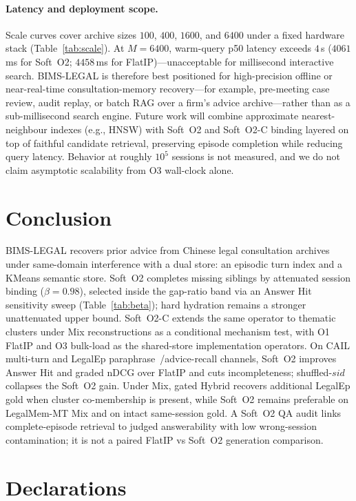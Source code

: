 \documentclass[preprint,12pt,authoryear]{elsarticle}
\begin{document}
\paragraph{Latency and deployment scope.}
Scale curves cover archive sizes $100$, $400$, $1600$, and $6400$ under a fixed hardware stack (Table~\ref{tab:scale}).
At $M{=}6400$, warm-query p50 latency exceeds $4$\,s ($4061$\,ms for Soft~O2; $4458$\,ms for FlatIP)---unacceptable for millisecond interactive search.
BIMS-LEGAL is therefore best positioned for high-precision offline or near-real-time consultation-memory recovery---for example, pre-meeting case review, audit replay, or batch RAG over a firm's advice archive---rather than as a sub-millisecond search engine.
Future work will combine approximate nearest-neighbour indexes (e.g., HNSW) with Soft~O2 and Soft~O2-C binding layered on top of faithful candidate retrieval, preserving episode completion while reducing query latency.
Behavior at roughly $10^5$ sessions is not measured, and we do not claim asymptotic scalability from O3 wall-clock alone.

\section{Conclusion}\label{sec:conclusion}

BIMS-LEGAL recovers prior advice from Chinese legal consultation archives under same-domain interference with a dual store: an episodic turn index and a KMeans semantic store.
Soft~O2 completes missing siblings by attenuated session binding ($\beta{=}0.98$), selected inside the gap-ratio band via an Answer Hit sensitivity sweep (Table~\ref{tab:beta}); hard hydration remains a stronger unattenuated upper bound.
Soft~O2-C extends the same operator to thematic clusters under Mix reconstructions as a conditional mechanism test, with O1 FlatIP and O3 bulk-load as the shared-store implementation operators.
On CAIL multi-turn and LegalEp paraphrase~/advice-recall channels, Soft~O2 improves Answer Hit and graded nDCG over FlatIP and cuts incompleteness; shuffled-$sid$ collapses the Soft~O2 gain.
Under Mix, gated Hybrid recovers additional LegalEp gold when cluster co-membership is present, while Soft~O2 remains preferable on LegalMem-MT Mix and on intact same-session gold.
A Soft~O2 QA audit links complete-episode retrieval to judged answerability with low wrong-session contamination; it is not a paired FlatIP vs Soft~O2 generation comparison.

\section*{Declarations}
\end{document}
